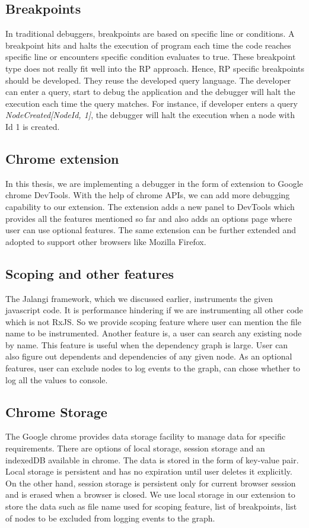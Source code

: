 \subsection{Breakpoints}
In traditional debuggers, breakpoints are based on specific line or conditions. A breakpoint hits and halts the execution of program each time the code reaches specific line or encounters specific condition evaluates to true. These breakpoint type does not really fit well into the RP approach. Hence, RP specific breakpoints should be developed. They reuse the developed query language. The developer can enter a query, start to debug the application and the debugger will halt the execution each time the query matches. For instance, if developer enters a query \textit{NodeCreated[NodeId, 1]}, the debugger will halt the execution when a node with Id 1 is created. 

\subsection{Chrome extension}
In this thesis, we are implementing a debugger in the form of extension to Google chrome DevTools. With the help of chrome APIs, we can add more debugging capability to our extension. The extension adds a new panel to DevTools which provides all the features mentioned so far and also adds an options page where user can use optional features. The same extension can be further extended and adopted to support other browsers like Mozilla Firefox\cite{firefox}.

\subsection{Scoping and other features}
The Jalangi framework, which we discussed earlier, instruments the given javascript code. It is performance hindering if we are instrumenting all other code which is not RxJS. So we provide scoping feature where user can mention the file name to be instrumented. 
Another feature is, a user can search any existing node by name. This feature is useful when the dependency graph is large. User can also figure out dependents and dependencies of any given node. As an optional features, user can exclude nodes to log events to the graph, can chose whether to log all the values to console. 

\subsection{Chrome Storage}
The Google chrome provides data storage facility to manage data for specific requirements\cite{chrome-storage}. There are options of local storage, session storage and an indexedDB available in chrome. The data is stored in the form of key-value pair. Local storage is persistent and has no expiration until user deletes it explicitly. On the other hand, session storage is persistent only for current browser session and is erased when a browser is closed. We use local storage in our extension to store the data such as file name used for scoping feature, list of breakpoints, list of nodes to be excluded from logging events to the graph.

